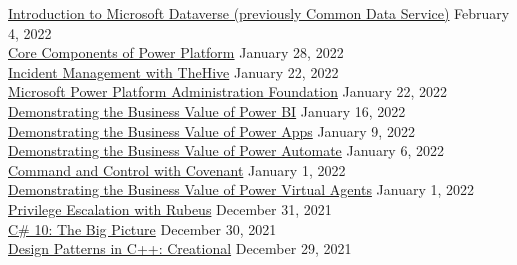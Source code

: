 \documentclass[10pt]{res} %
\begin{document}
\begin{resume}
\href{https://bjdelacruz.dev/files/certificates/pluralsight/2_Introduction_to_Microsoft_Dataverse_previously_Common_Data_Service.pdf}{\color{blue}Introduction to Microsoft Dataverse (previously Common Data Service)} \hfill February 4, 2022 \\
\href{https://bjdelacruz.dev/files/certificates/pluralsight/2_Core_Components_of_Power_Platform.pdf}{\color{blue}Core Components of Power Platform} \hfill January 28, 2022 \\
\href{https://bjdelacruz.dev/files/certificates/pluralsight/25_Incident_Management_with_TheHive.pdf}{\color{blue}Incident Management with TheHive} \hfill January 22, 2022 \\
\href{https://bjdelacruz.dev/files/certificates/pluralsight/3_Microsoft_Power_Platform_Administration_Foundation.pdf}{\color{blue}Microsoft Power Platform Administration Foundation} \hfill January 22, 2022 \\
\href{https://bjdelacruz.dev/files/certificates/pluralsight/3_Demonstrating_the_Business_Value_of_Power_BI.pdf}{\color{blue}Demonstrating the Business Value of Power BI} \hfill January 16, 2022 \\
\href{https://bjdelacruz.dev/files/certificates/pluralsight/4_Demonstrating_the_Business_Value_of_Power_Apps.pdf}{\color{blue}Demonstrating the Business Value of Power Apps} \hfill January 9, 2022 \\
\href{https://bjdelacruz.dev/files/certificates/pluralsight/5_Demonstrating_the_Business_Value_of_Power_Automate.pdf}{\color{blue}Demonstrating the Business Value of Power Automate} \hfill January 6, 2022 \\
\href{https://bjdelacruz.dev/files/certificates/pluralsight/52_Command_and_Control_with_Covenant.pdf}{\color{blue}Command and Control with Covenant} \hfill January 1, 2022 \\
\href{https://bjdelacruz.dev/files/certificates/pluralsight/6_Demonstrating_the_Business_Value_of_Power_Virtual_Agents.pdf}{\color{blue}Demonstrating the Business Value of Power Virtual Agents} \hfill January 1, 2022 \\
\href{https://bjdelacruz.dev/files/certificates/pluralsight/26_Privilege_Escalation_with_Rubeus.pdf}{\color{blue}Privilege Escalation with Rubeus} \hfill December 31, 2021 \\
\href{https://bjdelacruz.dev/files/certificates/pluralsight/C_10_The_Big_Picture.pdf}{\color{blue}C\# 10: The Big Picture} \hfill December 30, 2021 \\
\href{https://bjdelacruz.dev/files/certificates/pluralsight/Design_Patterns_in_C_Creational.pdf}{\color{blue}Design Patterns in C++: Creational} \hfill December 29, 2021 \\

\end{resume}
\end{document}
